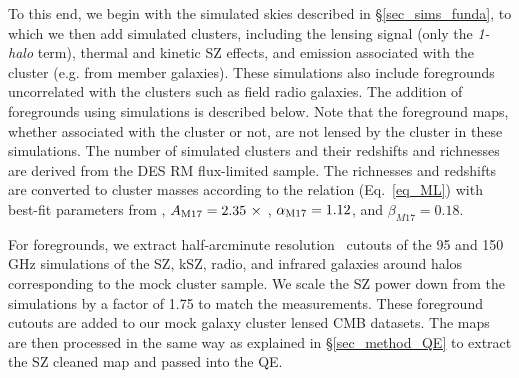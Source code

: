 To this end, we begin with the simulated skies described in \S\ref{sec_sims_funda}, to which we then add simulated clusters, including the lensing signal (only the {\it 1-halo} term), thermal and kinetic SZ effects, and emission associated with the cluster (e.g. from member galaxies). %
These simulations also include foregrounds uncorrelated with the clusters such as field radio galaxies.
The addition of foregrounds using \cite{sehgal10} simulations is described below. 
Note that the foreground maps, whether associated with the cluster or not, are not lensed by the cluster in these simulations. 
The number of simulated clusters and their redshifts and richnesses are derived from the  DES RM \whichyear{} flux-limited sample. 
The richnesses and redshifts are converted to cluster masses according to the \ML{} relation (Eq.~\ref{eq_ML}) with best-fit parameters from \citet{melchoir17}, $A_{\rm M17} = 2.35\ \times$ \munits, $\alpha_{\rm M17} = 1.12$, and $\beta_{M17} = 0.18$.  

For foregrounds, we extract half-arcminute resolution \boxsize\ cutouts of the 95 and 150 GHz \cite{sehgal10} simulations of the SZ, kSZ, radio, and infrared galaxies around halos corresponding to the mock cluster sample. %
We scale the SZ power down from the \cite{sehgal10} simulations by a factor of 1.75 to match the \citet{george15} measurements.
These foreground cutouts are added to our mock galaxy cluster lensed CMB datasets. %
The maps are then processed in the same way as explained in \S\ref{sec_method_QE} to extract the SZ cleaned map and passed into the QE. 


